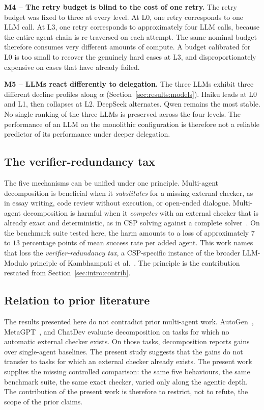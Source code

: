 \documentclass[11pt,a4paper]{article}
\begin{document}
\textbf{M4 -- The retry budget is blind to the cost of one retry.} The retry budget was fixed to three at every level. At L0, one retry corresponds to one LLM call. At L3, one retry corresponds to approximately four LLM calls, because the entire agent chain is re-traversed on each attempt. The same nominal budget therefore consumes very different amounts of compute. A budget calibrated for L0 is too small to recover the genuinely hard cases at L3, and disproportionately expensive on cases that have already failed.

\textbf{M5 -- LLMs react differently to delegation.} The three LLMs exhibit three different decline profiles along $\alpha$ (Section~\ref{sec:results:models}). Haiku leads at L0 and L1, then collapses at L2. DeepSeek alternates. Qwen remains the most stable. No single ranking of the three LLMs is preserved across the four levels. The performance of an LLM on the monolithic configuration is therefore not a reliable predictor of its performance under deeper delegation.

\subsection{The verifier-redundancy tax}\label{sec:discussion:tax}
The five mechanisms can be unified under one principle. Multi-agent decomposition is beneficial when it \emph{substitutes} for a missing external checker, as in essay writing, code review without execution, or open-ended dialogue. Multi-agent decomposition is harmful when it \emph{competes} with an external checker that is already exact and deterministic, as in CSP solving against a complete solver~\cite{R8}. On the benchmark suite tested here, the harm amounts to a loss of approximately $7$ to $13$ percentage points of mean success rate per added agent. This work names that loss the \emph{verifier-redundancy tax}, a CSP-specific instance of the broader LLM-Modulo principle of Kambhampati et al.~\cite{R8}. The principle is the contribution restated from Section~\ref{sec:intro:contrib}.

\subsection{Relation to prior literature}\label{sec:discussion:relation}
The results presented here do not contradict prior multi-agent work. AutoGen~\cite{R5}, MetaGPT~\cite{R6}, and ChatDev evaluate decomposition on tasks for which no automatic external checker exists. On those tasks, decomposition reports gains over single-agent baselines. The present study suggests that the gains do not transfer to tasks for which an external checker already exists. The present work supplies the missing controlled comparison: the same five behaviours, the same benchmark suite, the same exact checker, varied only along the agentic depth. The contribution of the present work is therefore to restrict, not to refute, the scope of the prior claims.
\end{document}
